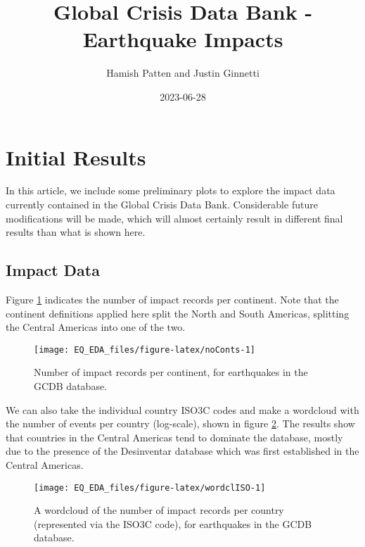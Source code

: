 \documentclass[
]{article}
\title{Global Crisis Data Bank - Earthquake Impacts}
\author{Hamish Patten and Justin Ginnetti}
\date{2023-06-28}
\begin{document}
\maketitle

{
\setcounter{tocdepth}{2}
\tableofcontents
}
\hypertarget{initial-results}{%
\section{Initial Results}\label{initial-results}}

In this article, we include some preliminary plots to explore the impact data currently contained in the Global Crisis Data Bank. Considerable future modifications will be made, which will almost certainly result in different final results than what is shown here.

\hypertarget{impact-data}{%
\subsection{Impact Data}\label{impact-data}}

Figure \ref{fig:noConts} indicates the number of impact records per continent. Note that the continent definitions applied here split the North and South Americas, splitting the Central Americas into one of the two.

\begin{figure}
\texttt{[image: EQ\_EDA\_files/figure-latex/noConts-1]} \caption[Number of impact records per continent, for earthquakes in the GCDB database]{Number of impact records per continent, for earthquakes in the GCDB database.}\label{fig:noConts}
\end{figure}

We can also take the individual country ISO3C codes and make a wordcloud with the number of events per country (log-scale), shown in figure \ref{fig:wordclISO}. The results show that countries in the Central Americas tend to dominate the database, mostly due to the presence of the Desinventar database which was first established in the Central Americas.

\begin{figure}
\texttt{[image: EQ\_EDA\_files/figure-latex/wordclISO-1]} \caption[A wordcloud of the number of impact records per country (represented via the ISO3C code), for earthquakes in the GCDB database]{A wordcloud of the number of impact records per country (represented via the ISO3C code), for earthquakes in the GCDB database.}\label{fig:wordclISO}
\end{figure}
\end{document}
